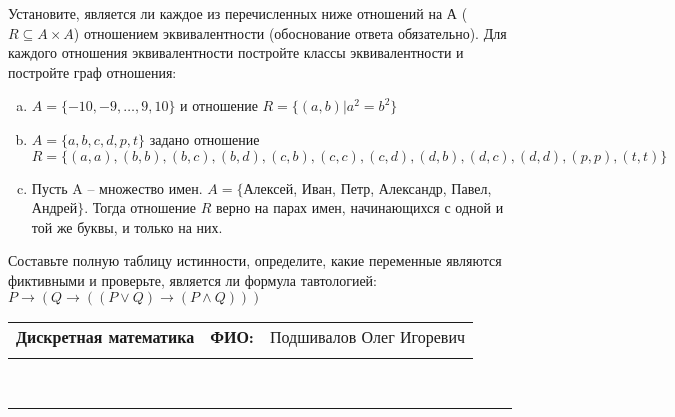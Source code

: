 \documentclass[10pt]{exam}
\newcommand{\class}{Дискретная математика}
\newcommand{\examdate}{}
\begin{document}
\begin{questions}
\question
Установите, является ли каждое из перечисленных ниже отношений на А ($R \subseteq A \times A$) отношением эквивалентности (обоснование ответа обязательно). Для каждого отношения эквивалентности постройте классы 
эквивалентности и постройте граф отношения:
\begin{enumerate} [a)]\setcounter{enumi}{0}
\item $A = \{-10, -9, … , 9, 10\}$ и отношение $R = \{(a,b)|a^{2} = b^{2}\}$
\item $A = \{a, b, c, d, p, t\}$ задано отношение $R = \{(a, a), (b, b), (b, c), (b, d), (c, b), (c, c), (c, d), (d, b), (d, c), (d, d), (p,p), (t,t)\}$
\item Пусть A – множество имен. $A = \{ $Алексей, Иван, Петр, Александр, Павел, Андрей$ \}$. Тогда отношение $R$ верно на парах имен, начинающихся с одной и той же буквы, и только на них.
\end{enumerate}\question Составьте полную таблицу истинности, определите, какие переменные являются фиктивными и проверьте, является ли формула тавтологией:
$ P \rightarrow (Q \rightarrow ((P \lor Q) \rightarrow (P \land Q)))$

\end{questions}
\newpage
\begin{flushright}
\begin{tabular}{p{2.8in} r l}
\textbf{\class} & \textbf{ФИО:} &Подшивалов Олег Игоревич
\\

\textbf{\examdate} &&\\
\end{tabular}\\
\end{flushright}
\rule[1ex]{\textwidth}{.1pt}
\end{document}
